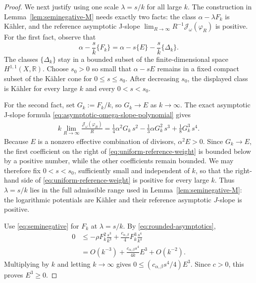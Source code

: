 \documentclass[10pt,a4paper]{amsart}
\def\R{\mathbb{R}}
\def\cJ{{\mathcal J}}
\begin{document}
\begin{proof}
We next justify using one scale $\lambda=s/k$ for all large $k$.
The construction in Lemma~\ref{lem:seminegative-M} needs exactly two
facts: the class $\alpha-\lambda F_k$ is K\"ahler, and the
reference asymptotic J-slope $\lim_{R\to\infty}R^{-1}\cJ_{\omega}(\varphi_R)$ is positive.
For the first fact, observe that
\[
 \alpha-\frac{s}{k}\{F_k\}
 =\alpha-s\{E\}-\frac{s}{k}\{\Delta_k\}.
\]
The classes $\{\Delta_k\}$ stay in a bounded subset of the
finite-dimensional space $H^{1,1}(X,\R)$.  Choose $s_0>0$ so small
that $\alpha-sE$ remains in a fixed compact subset of the K\"ahler
cone for $0\leq s\leq s_0$.  After decreasing $s_0$, the displayed
class is K\"ahler for every large $k$ and every $0<s<s_0$.

For the second fact, set $G_k:=F_k/k$, so $G_k\to E$ as $k\to \infty$.
The exact asymptotic J-slope formula
\eqref{eq:asymptotic-omega-slope-polynomial} gives
\begin{equation}\label{eq:uniform-reference-weight}
\begin{aligned}
 k\lim_{R\to \infty}\frac{\cJ_\omega(\varphi_R)}{R}
  =\frac14\alpha^2G_k\,s^2
       -\frac13\alpha G_k^2\,s^3
       +\frac18G_k^3\,s^4.
\end{aligned}
\end{equation}
Because $E$ is a nonzero effective combination of divisors,
$\alpha^2E>0$.  Since $G_k\to E$, the first coefficient on the
right of \eqref{eq:uniform-reference-weight} is bounded below by a
positive number, while the other
coefficients remain bounded.  We may therefore fix
$0<s<s_0$, sufficiently small and independent of $k$, so that the
right-hand side of \eqref{eq:uniform-reference-weight} is positive for
every large $k$.
Thus $\lambda=s/k$ lies in the full admissible range used in
Lemma~\ref{lem:seminegative-M}: the logarithmic potentials are K\"ahler and their
reference asymptotic $J$-slope is positive.

Use \eqref{eq:seminegative} for $F_k$ at $\lambda=s/k$.  By
\eqref{eq:rounded-asymptotics},
\[
\begin{aligned}
 0
 &\leq-\rho F_k^2\frac{s^3}{k^3}
       +\frac{c_{\alpha,\beta}}{4}F_k^3\frac{s^4}{k^4}\\
 &=O(k^{-3})+\frac{c_{\alpha,\beta}s^4}{4k}E^3+O(k^{-2}).
\end{aligned}
\]
Multiplying by $k$ and letting $k\to\infty$ gives
$0\leq(c_{\alpha,\beta}s^4/4)E^3$.  Since $c>0$, this proves $E^3\geq0$.


\end{proof}
\end{document}
